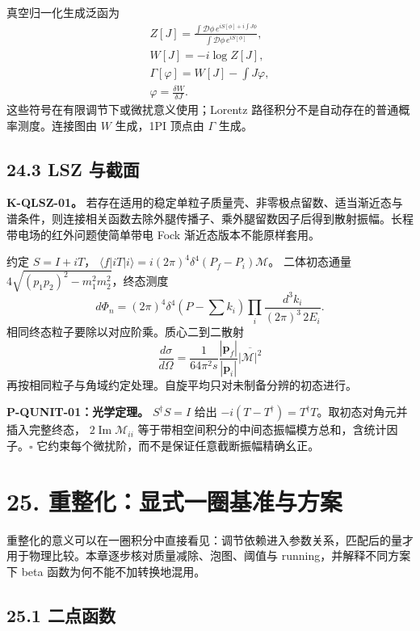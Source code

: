 \documentclass[
  11pt,
  oneside]{book}
\begin{document}
真空归一化生成泛函为 \[
\begin{gathered}
Z[J]=\frac{\int\mathcal D\phi\,
e^{iS[\phi]+i\int J\phi}}{\int\mathcal D\phi\,e^{iS[\phi]}},
\\ W[J]=-i\log Z[J],\\
\Gamma[\varphi]=W[J]-\int J\varphi,\\
\varphi=\frac{\delta W}{\delta J}.
\end{gathered}
\] 这些符号在有限调节下或微扰意义使用；Lorentz
路径积分不是自动存在的普通概率测度。连接图由 \(W\) 生成，1PI 顶点由
\(\Gamma\) 生成。

\section{24.3 LSZ 与截面}

\textbf{K-QLSZ-01。}
若存在适用的稳定单粒子质量壳、非零极点留数、适当渐近态与谱条件，则连接相关函数去除外腿传播子、乘外腿留数因子后得到散射振幅。长程带电场的红外问题使简单带电
Fock 渐近态版本不能原样套用。

约定 \(S=I+iT\)，
\(\langle f|iT|i\rangle=i(2\pi)^4\delta^4(P_f-P_i)\mathcal M\)。
二体初态通量 \(4\sqrt{(p_1p_2)^2-m_1^2m_2^2}\)，终态测度 \[
d\Phi_n=(2\pi)^4\delta^4(P-\sum k_i)
\prod_i\frac{d^3k_i}{(2\pi)^3\,2E_i}.
\] 相同终态粒子要除以对应阶乘。质心二到二散射 \[
\frac{d\sigma}{d\Omega}=\frac1{64\pi^2s}
\frac{|\mathbf p_f|}{|\mathbf p_i|}\overline{|\mathcal M|^2}
\] 再按相同粒子与角域约定处理。自旋平均只对未制备分辨的初态进行。

\protect\hypertarget{p-qunit-01}{}{}

\textbf{P-QUNIT-01：光学定理。} \(S^\dagger S=I\) 给出
\(-i(T-T^\dagger)=T^\dagger T\)。取初态对角元并插入完整终态，
\(2\operatorname{Im}\mathcal M_{ii}\)
等于带相空间积分的中间态振幅模方总和，含统计因子。\(\square\)
它约束每个微扰阶，而不是保证任意截断振幅精确幺正。

\chapter{25. 重整化：显式一圈基准与方案}\label{ch-25}\hypertarget{ch-25}{}

重整化的意义可以在一圈积分中直接看见：调节依赖进入参数关系，匹配后的量才用于物理比较。本章逐步核对质量减除、泡图、阈值与
running，并解释不同方案下 beta 函数为何不能不加转换地混用。

\section{25.1 二点函数}
\end{document}
